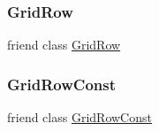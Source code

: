 \subsubsection{\texorpdfstring{Grid\+Row}{GridRow}}
{\footnotesize\ttfamily friend class \mbox{\hyperlink{classGrid_1_1GridRow}{Grid\+Row}}\hspace{0.3cm}{\ttfamily [friend]}}

\mbox{\label{classGrid_aba3ef1df6ffede859468bdcab36ab6d6}} 
\subsubsection{\texorpdfstring{Grid\+Row\+Const}{GridRowConst}}
{\footnotesize\ttfamily friend class \mbox{\hyperlink{classGrid_1_1GridRowConst}{Grid\+Row\+Const}}\hspace{0.3cm}{\ttfamily [friend]}}

